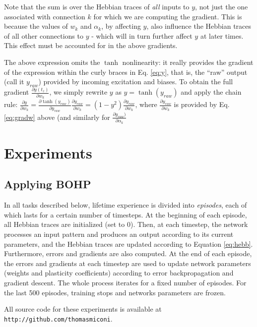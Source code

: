 \documentclass{article}
\begin{document}
Note that the sum is over the Hebbian traces of \emph{all} inputs to $y$, not just the
one associated with connection $k$ for which we are computing the gradient. This is because the values of $w_k$ and
$\alpha_k$, by affecting $y$, also influence the Hebbian traces of all other
connections to $y$ - which will in turn further affect $y$ at later times. This effect must be accounted for in the above gradients.

The above expression omits the $\tanh$ nonlinearity: it really provides the
gradient of the expression within the curly braces in Eq. \ref{eq:y}, that is,
the ``raw'' output (call it $y_{raw}$) provided by incoming excitation and biases. To obtain
the full gradient $\frac{\partial y(t_z)}{\partial w_k}$, we simply rewrite $y$ as $y =
\tanh(y_{raw})$ and apply the chain rule: $\frac{\partial y}{\partial w_k} =
\frac{\partial \tanh(y_{raw})}{\partial y_{raw}} \frac{\partial y_{raw}}{\partial
w_k} = (1 - y^2)\frac{\partial y_{raw}}{\partial w_k}$, where $\frac{\partial
y_{raw}}{\partial w_k}$ is provided by Eq. \ref{eq:gradw} above (and similarly
for $\frac{\partial
y_{raw})}{\partial \alpha_k}$ 

\section{Experiments}

\subsection{Applying BOHP}

In all tasks described below, lifetime experience is divided into
\emph{episodes}, each of which lasts for a certain number of timesteps. At the
beginning of each episode, all Hebbian traces are initialized (set to 0). Then,
at each timestep, the network processes an input pattern and produces an output
according to its current parameters, and the Hebbian traces are updated
according to Equation \ref{eq:hebb}. Furthermore, errors and gradients are also
computed. At the end of each episode, the errors and gradients at each timestep
are used to update network parameters (weights and plasticity coefficients)
according to error backpropagation and gradient descent. The whole process
iterates for a fixed number of episodes. For the last 500 episodes, training
stops and networks parameters are frozen.

All source code for these experiments is available at \texttt{http://github.com/thomasmiconi}.
\end{document}
